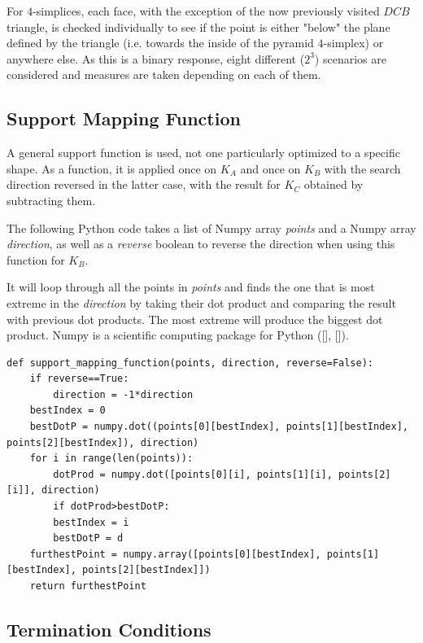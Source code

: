For $4$-simplices, each face, with the exception of the now previously visited $DCB$ triangle, is checked individually to see if the point is either "below" the plane defined by the triangle (i.e. towards the inside of the pyramid $4$-simplex) or anywhere else. As this is a binary response, eight different ($2^3$) scenarios are considered and measures are taken depending on each of them.



\subsection{Support Mapping Function}

A general support function is used, not one particularly optimized to a specific shape. As a function, it is applied once on $K_A$ and once on $K_B$ with the search direction reversed in the latter case, with the result for $K_C$ obtained by subtracting them.

The following Python code takes a list of Numpy array \textit{points} and a Numpy array \textit{direction}, as well as a \textit{reverse} boolean to reverse the direction when using this function for $K_B$. 

It will loop through all the points in \textit{points} and finds the one that is most extreme in the \textit{direction} by taking their dot product and comparing the result with previous dot products. The most extreme will produce the biggest dot product. Numpy is a scientific computing package for Python ([\citeauthor{TravisE2006}], [\citeauthor{VanderWalt2011}]).

\begin{lstlisting}
def support_mapping_function(points, direction, reverse=False):
	if reverse==True: 
		direction = -1*direction
	bestIndex = 0
	bestDotP = numpy.dot((points[0][bestIndex], points[1][bestIndex], points[2][bestIndex]), direction)
	for i in range(len(points)):
		dotProd = numpy.dot([points[0][i], points[1][i], points[2][i]], direction)
		if dotProd>bestDotP:
		bestIndex = i
		bestDotP = d
	furthestPoint = numpy.array([points[0][bestIndex], points[1][bestIndex], points[2][bestIndex]])
	return furthestPoint
\end{lstlisting}



\subsection{Termination Conditions}

